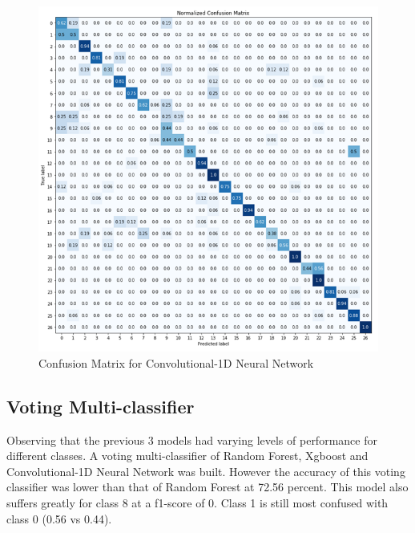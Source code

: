 \documentclass[conference]{IEEEtran}
\begin{document}
\begin{figure}[H]
\begin{center}
\includegraphics[scale=1]{Image/cnn1d_27_class_confusion.png}
\caption{\label{cnn1d_27_class_confusion} Confusion Matrix for Convolutional-1D Neural Network}
\end{center}
\end{figure}

\subsection{Voting Multi-classifier}

Observing that the previous 3 models had varying levels of performance for different classes. A voting multi-classifier of Random Forest, Xgboost and Convolutional-1D Neural Network was built. However the accuracy of this voting classifier was lower than that of Random Forest at 72.56 percent. This model also suffers greatly for class 8 at a f1-score of 0. Class 1 is still most confused with class 0 (0.56 vs 0.44).
\end{document}
